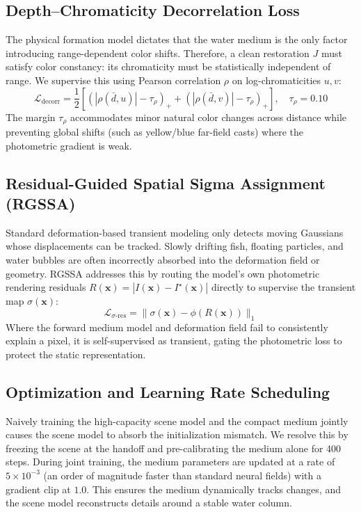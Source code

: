 \documentclass[11pt,a4paper]{article}
\begin{document}
\subsection{Depth--Chromaticity Decorrelation Loss}
The physical formation model dictates that the water medium is the only factor introducing range-dependent color shifts. Therefore, a clean restoration $J$ must satisfy color constancy: its chromaticity must be statistically independent of range. We supervise this using Pearson correlation $\rho$ on log-chromaticities $u, v$:
\begin{equation}
    \mathcal{L}_{\text{decorr}} = \frac{1}{2}\left[ \left(|\rho(\bar{d}, u)| - \tau_{\rho}\right)_+ + \left(|\rho(\bar{d}, v)| - \tau_{\rho}\right)_+ \right], \quad \tau_{\rho} = 0.10
\end{equation}
The margin $\tau_{\rho}$ accommodates minor natural color changes across distance while preventing global shifts (such as yellow/blue far-field casts) where the photometric gradient is weak.

\subsection{Residual-Guided Spatial Sigma Assignment (RGSSA)}
Standard deformation-based transient modeling only detects moving Gaussians whose displacements can be tracked. Slowly drifting fish, floating particles, and water bubbles are often incorrectly absorbed into the deformation field or geometry. RGSSA addresses this by routing the model's own photometric rendering residuals $R(\mathbf{x}) = |I(\mathbf{x}) - I^\star(\mathbf{x})|$ directly to supervise the transient map $\sigma(\mathbf{x})$:
\begin{equation}
    \mathcal{L}_{\sigma\text{-res}} = \|\sigma(\mathbf{x}) - \phi(R(\mathbf{x}))\|_1
\end{equation}
Where the forward medium model and deformation field fail to consistently explain a pixel, it is self-supervised as transient, gating the photometric loss to protect the static representation.

\subsection{Optimization and Learning Rate Scheduling}
Naively training the high-capacity scene model and the compact medium jointly causes the scene model to absorb the initialization mismatch. We resolve this by freezing the scene at the handoff and pre-calibrating the medium alone for 400 steps. During joint training, the medium parameters are updated at a rate of $5\times 10^{-3}$ (an order of magnitude faster than standard neural fields) with a gradient clip at $1.0$. This ensures the medium dynamically tracks changes, and the scene model reconstructs details around a stable water column.



\end{document}
